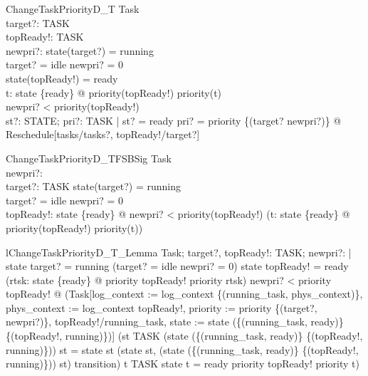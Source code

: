 \documentclass[a4paper, 12pt]{article}
\begin{document}
\begin{schema}{ChangeTaskPriorityD\_T}
  \Delta Task\\
  target?: TASK\\
  topReady!: TASK\\
  newpri?: \nat 
\where
  state(target?) = running\\
  target? = idle \implies  newpri? = 0\\
  state(topReady!) = ready\\
  \forall  t: state \inv  \limg  \{ready\} \rimg  @ priority(topReady!) \geq  priority(t)\\
  newpri? < priority(topReady!)\\
  \exists  st?: STATE; pri?: TASK \fun  \nat  | st? = ready \land  pri? = priority \oplus  \{(target? \mapsto  newpri?)\} @ Reschedule[tasks/tasks?, topReady!/target?]
\end{schema}

\begin{schema}{ChangeTaskPriorityD\_TFSBSig}
  Task\\
  newpri?: \nat \\
  target?: TASK
\where
  state(target?) = running\\
  target? = idle \implies  newpri? = 0\\
  \exists topReady!: state \inv \limg \{ready\} \rimg @  newpri? < priority(topReady!) \land  (\forall  t: state \inv  \limg  \{ready\} \rimg  @ priority(topReady!) \geq  priority(t))
\end{schema}

\begin{theorem}{lChangeTaskPriorityD\_T\_Lemma}
\forall  Task; target?, topReady!: TASK; newpri?: \nat | state target? = running \land  (target? = idle \implies  newpri? = 0) \land  state topReady! = ready \land  (\forall  rtsk: state \inv  \limg  \{ready\} \rimg  @ priority topReady! \geq  priority rtsk) \land  newpri? < priority topReady! @ \lnot  (Task[log\_context := log\_context \oplus  \{(running\_task, phys\_context)\}, phys\_context := log\_context topReady!, priority := priority \oplus  \{(target?, newpri?)\}, topReady!/running\_task, state := state \oplus  (\{(running\_task, ready)\} \cup  \{(topReady!, running)\})] \land  (st \in  TASK \land  \lnot  (state \oplus  (\{(running\_task, ready)\} \cup  \{(topReady!, running)\})) st = state st \implies  (state st, (state \oplus  (\{(running\_task, ready)\} \cup  \{(topReady!, running)\})) st) \in  transition) \implies  t \in  TASK \land  state t = ready \land  \lnot  priority topReady! \geq  priority t)
\end{theorem}
\end{document}
